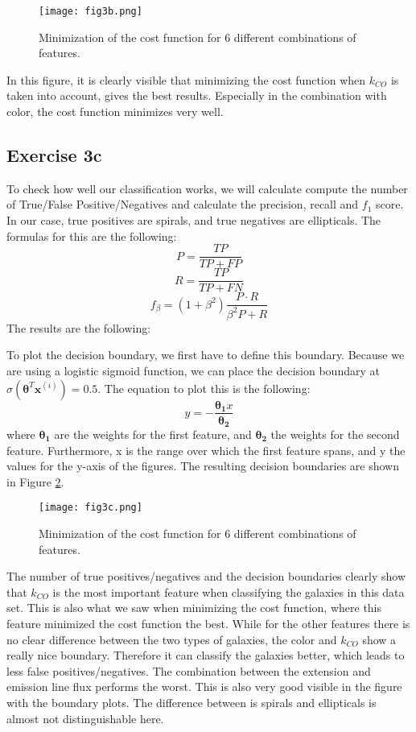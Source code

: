 \begin{figure}[h!]
  \centering
  \texttt{[image: fig3b.png]}
  \caption{Minimization of the cost function for 6 different combinations of features.}
  \label{fig:3b}
\end{figure}
In this figure, it is clearly visible that minimizing the cost function when $k_{CO}$ is taken into account, gives the best results. Especially in the combination with color, the cost function minimizes very well. 

\subsection{Exercise 3c}
To check how well our classification works, we will calculate compute the number of True/False Positive/Negatives and calculate the precision, recall and $f_1$ score. In our case, true positives are spirals, and true negatives are ellipticals. The formulas for this are the following: 
\begin{equation}
    P = \frac{TP}{TP + FP}
\end{equation}
\begin{equation}
    R = \frac{TP}{TP + FN}
\end{equation}
\begin{equation}
    f_{\beta} = (1+\beta^2)\frac{P \cdot R}{\beta^2P + R}
\end{equation}
The results are the following: 

To plot the decision boundary, we first have to define this boundary. Because we are using a logistic sigmoid function, we can place the decision boundary at $\sigma (\boldsymbol{\theta}^T \mathbf{x}^{(i)}) = 0.5$. The equation to plot this is the following: 
\begin{equation}
    y = -\frac{\boldsymbol{\theta_1}x}{\boldsymbol{\theta_2}}
\end{equation}
where $\boldsymbol{\theta_1}$ are the weights for the first feature, and $\boldsymbol{\theta_2}$ the weights for the second feature. Furthermore, x is the range over which the first feature spans, and y the values for the y-axis of the figures. The resulting decision boundaries are shown in Figure \ref{fig:3c}.
\begin{figure}[h!]
  \centering
  \texttt{[image: fig3c.png]}
  \caption{Minimization of the cost function for 6 different combinations of features.}
  \label{fig:3c}
\end{figure}
The number of true positives/negatives and the decision boundaries clearly show that $k_{CO}$ is the most important feature when classifying the galaxies in this data set. This is also what we saw when minimizing the cost function, where this feature minimized the cost function the best. While for the other features there is no clear difference between the two types of galaxies, the color and $k_{CO}$ show a really nice boundary. Therefore it can classify the galaxies better, which leads to less false positives/negatives. The combination between the extension and emission line flux performs the worst. This is also very good visible in the figure with the boundary plots. The difference between is spirals and ellipticals is almost not distinguishable here. 
